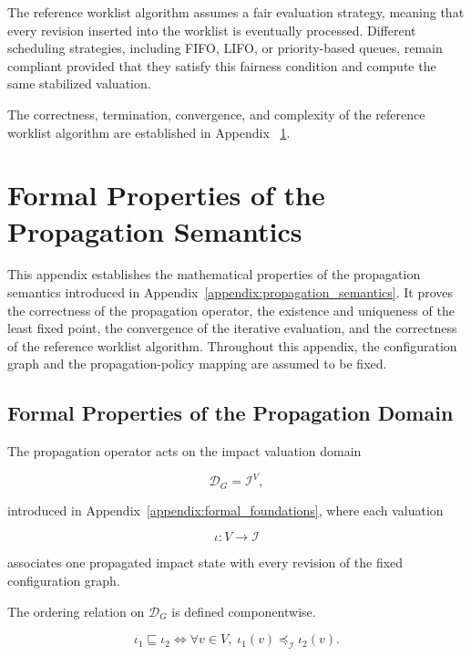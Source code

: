 \documentclass[10pt]{article}
\begin{document}
The reference worklist algorithm assumes a fair evaluation strategy, meaning
that every revision inserted into the worklist is eventually processed.
Different scheduling strategies, including FIFO, LIFO, or priority-based
queues, remain compliant provided that they satisfy this fairness condition and
compute the same stabilized valuation.

The correctness, termination, convergence, and complexity of the reference
worklist algorithm are established in Appendix ~\ref{appendix:formal_properties}.

\section{Formal Properties of the Propagation Semantics}
\label{appendix:formal_properties}

This appendix establishes the mathematical properties of the propagation
semantics introduced in Appendix~\ref{appendix:propagation_semantics}. It
proves the correctness of the propagation operator, the existence and
uniqueness of the least fixed point, the convergence of the iterative
evaluation, and the correctness of the reference worklist algorithm. Throughout
this appendix, the configuration graph and the propagation-policy mapping are
assumed to be fixed.

\subsection{Formal Properties of the Propagation Domain}
\label{appendix:finite_lattice}
The propagation operator acts on the impact valuation domain

\[
\mathcal D_G
=
\mathcal I^V,
\]

introduced in Appendix~\ref{appendix:formal_foundations}, where each valuation

\[
\iota : V \rightarrow \mathcal I
\]

associates one propagated impact state with every revision of the fixed
configuration graph.

The ordering relation on $\mathcal D_G$ is defined componentwise.

\begin{equation}
	\label{eq:product_order}
	\iota_1
	\sqsubseteq
	\iota_2
	\iff
	\forall v\in V,\;
	\iota_1(v)
	\preceq_{\mathcal I}
	\iota_2(v).
\end{equation}
\end{document}
